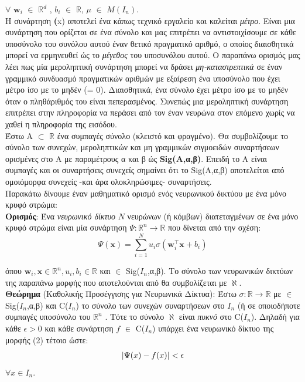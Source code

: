 \documentclass[11pt]{article} %
\begin{document}
$\forall$ $\textbf{w}_i$ $\in$   $\mathbb{R}^d$ , $b_i$ $\in$ $\mathbb{R}$, $\mu$ $\in$ $M(I_n)$.\\

Η συνάρτηση \mu \textbf(x) αποτελεί ένα κάπως τεχνικό εργαλείο και καλείται \textit{μέτρο}. Είναι μια συνάρτηση που ορίζεται σε ένα σύνολο και μας επιτρέπει να αντιστοιχίσουμε σε κάθε υποσύνολο του συνόλου αυτού έναν θετικό πραγματικό αριθμό, ο οποίος διαισθητικά μπορεί να ερμηνευθεί ώς το \textit{μέγεθος} του υποσυνόλου αυτού. Ο παραπάνω ορισμός μας λέει πως μία μεροληπτική συνάρτηση μπορεί να δράσει \textit{μη-καταστρεπτικά} σε έναν γραμμικό συνδυασμό πραγματικών αριθμών με εξαίρεση ένα υποσύνολο που έχει μέτρο ίσο με το μηδέν (\mu = 0). Διαισθητικά, ένα σύνολο έχει μέτρο ίσο με το μηδέν όταν ο πληθάριθμός του είναι πεπερασμένος. Συνεπώς μια μεροληπτική συνάρτηση επιτρέπει στην πληροφορία να περάσει από τον έναν νευρώνα στον επόμενο χωρίς να χαθεί η πληροφορία της εισόδου.\\

Έστω Α $\subset$ $\mathbb{R}$ ένα συμπαγές σύνολο (κλειστό και φραγμένο). Θα συμβολίζουμε το σύνολο των συνεχών, μεροληπτικών και μη γραμμικών σιγμοειδών συναρτήσεων ορισμένες στο Α με παραμέτρους α και β ώς \textbf{Sig(A,α,β)}. Επειδή το Α είναι συμπαγές και οι συναρτήσεις συνεχείς σημαίνει ότι το Sig(A,α,β) αποτελείται από ομοιόμορφα συνεχείς -και άρα ολοκληρώσιμες- συναρτήσεις. \\

Παρακάτω δίνουμε έναν μαθηματικό ορισμό ενός νευρωνικού δικτύου με ένα μόνο κρυφό στρώμα: \\

\textbf{Ορισμός}: Ένα \textit{νευρωνικό δίκτυο} $Ν$ νευρώνων (ή κόμβων) διατεταγμένων σε ένα μόνο κρυφό στρώμα είναι μία συνάρτηση $\Psi : \mathbb{R}^n \rightarrow \mathbb{R}$ που δίνεται από την σχέση:
\begin{equation}
 \displaystyle \Psi(\textbf{x}) = \sum_{i=1}^{N} u_i \sigma(\textbf{w}_i ^ \intercal \textbf{x} + b_i)
\end{equation}

όπου  $\textbf{w}_i,\textbf{x}  \in \mathbb{R}^n, u_i,b_i \in \mathbb{R}$ και \sigma $\in$ Sig($I_n$,α,β). Το σύνολο των νευρωνικών δικτύων της παραπάνω μορφής που αποτελούνται από  θα συμβολίζεται με $\aleph.$ \\

\textbf{Θεώρημα} (Καθολικής Προσέγγισης για Νευρωνικά Δίκτυα): Έστω $\sigma : \mathbb{R} \rightarrow \mathbb{R}$  με  \sigma  $\in$ Sig($I_n$,α,β) και C($I_n$) το σύνολο των συνεχών συναρτήσεων στο $Ι_n$ (ή σε οποιοδήποτε συμπαγές υποσύνολο του $\mathbb{R}^n$ . Τότε το σύνολο $\aleph$ είναι \textit{πυκνό} στο C($I_n$). Δηλαδή για κάθε $\epsilon > 0$ και κάθε συνάρτηση $f$ $\in$ C($I_n$) υπάρχει ένα νευρωνικό δίκτυο της μορφής (2) τέτοιο ώστε: \\
 \begin{align*}
\abs{\Psi(x) - f(x)} < \epsilon 
\end{align*}
$\forall x \in I_n$. \\
\end{document}
